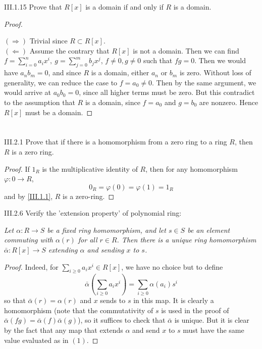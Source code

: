 \begin{problem}{III.1.15}
Prove that $R[x]$ is a domain if and only if $R$ is a domain.
\end{problem}
\begin{proof} \

\noindent $(\Rightarrow)$ Trivial since $R \subset R[x]$. \\
$(\Leftarrow)$ Assume the contrary that $R[x]$ is not a domain. Then we can find $f = \sum_{i=0}^n a_ix^i, \: g = \sum_{j=0}^m b_jx^j$, $f \neq 0, g \neq 0$ such that $fg = 0$. Then we would have $a_nb_m = 0$, and since $R$ is a domain, either $a_n$ or $b_m$ is zero. Without loss of generality, we can reduce the case to $f = a_0 \neq 0$. Then by the same argument, we would arrive at $a_0b_0 = 0$, since all higher terms must be zero. But this contradict to the assumption that $R$ is a domain, since $f = a_0$ and $g = b_0$ are nonzero. Hence $R[x]$ must be a domain.
\end{proof}

\section{}
\begin{problem}{III.2.1}
Prove that if there is a homomorphism from a zero ring to a ring $R$, then $R$ is a zero ring.
\end{problem}
\begin{proof}
If $1_R$ is the multiplicative identity of $R$, then for any homomorphism $\varphi : 0 \to R$,
\[
0_R = \varphi(0) = \varphi(1) = 1_R
\]
and by \ref{III.1.1}, $R$ is a zero-ring.
\end{proof}

\begin{problem}{III.2.6}
Verify the 'extension property' of polynomial ring:

\textit{
Let $\alpha : R \to S$ be a fixed ring homomorphism, and let $s \in S$ be an element commuting with $\alpha(r)$ for all $r \in R$. Then there is a unique ring homomorphism $\bar{\alpha} : R[x] \to S$ extending $\alpha$ and sending $x$ to $s$.
}
\end{problem}
\begin{proof}
Indeed, for $\sum_{i \geq 0} a_ix^i \in R[x]$, we have no choice but to define
\[
\bar{\alpha}\left(\sum_{i \geq 0} a_ix^i\right) = \sum_{i \geq 0}\alpha(a_i)s^{i}  \tag{1}
\]
so that $\bar{\alpha}(r) = \alpha(r)$ and $x$ sends to $s$ in this map. It is clearly a homomorphism (note that the commutativity of $s$ is used in the proof of $\bar{\alpha}(fg) = \bar{\alpha}(f)\bar{\alpha}(g)$), so it suffices to check that $\bar{\alpha}$ is unique. But it is clear by the fact that any map that extends $\alpha$ and send $x$ to $s$ must have the same value evaluated as in $(1)$.
\end{proof}

